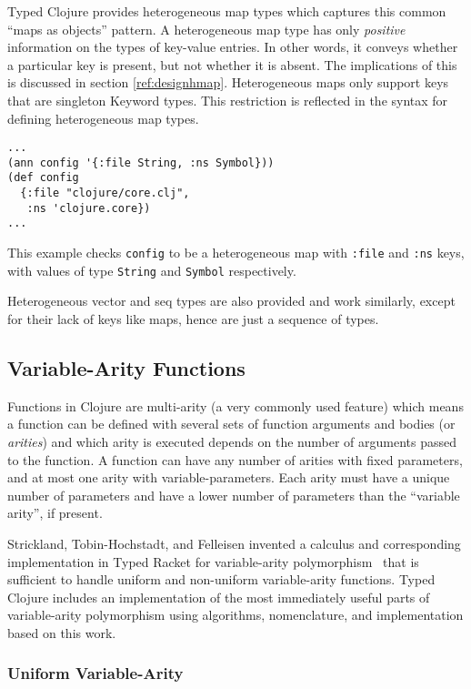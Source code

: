 Typed Clojure provides heterogeneous map types which captures this common
``maps as objects'' pattern. A heterogeneous map type has only \emph{positive}
information on the types of key-value entries. In other words, it conveys
whether a particular key is present, but not whether it is absent.
The implications of this is discussed in section \ref{ref:designhmap}.
Heterogeneous maps only support keys that are singleton Keyword types. This restriction is reflected
in the syntax for defining heterogeneous map types.

\begin{lstlisting}[caption=Heterogeneous map types in Typed Clojure]
...
(ann config '{:file String, :ns Symbol}))
(def config
  {:file "clojure/core.clj",
   :ns 'clojure.core})
...
\end{lstlisting}

This example checks \lstinline|config| to be a heterogeneous map
with \lstinline|:file| and \lstinline|:ns| keys, with values of
type \lstinline|String| and \lstinline|Symbol| respectively.

Heterogeneous vector and seq types are also provided and work similarly,
except for their lack of keys like maps, hence are just a sequence of types.

\subsection{Variable-Arity Functions}

Functions in Clojure are multi-arity (a very commonly used feature) which means a function
can be defined with several sets of function arguments and bodies (or \emph{arities})
and which arity is executed depends on the number of arguments passed
to the function. A function can have any number of arities with fixed parameters, and at most one arity with
variable-parameters. Each arity must have a unique number of
parameters and have a lower number of parameters than the ``variable arity'', if present.

Strickland, Tobin-Hochstadt, and Felleisen invented a calculus and corresponding
implementation in Typed Racket for variable-arity polymorphism~\cite{STF09}
that is sufficient to handle uniform and non-uniform variable-arity functions.
Typed Clojure includes an implementation of the most immediately useful parts of variable-arity
polymorphism using algorithms, nomenclature, and implementation based on this work.

\subsubsection{Uniform Variable-Arity}

